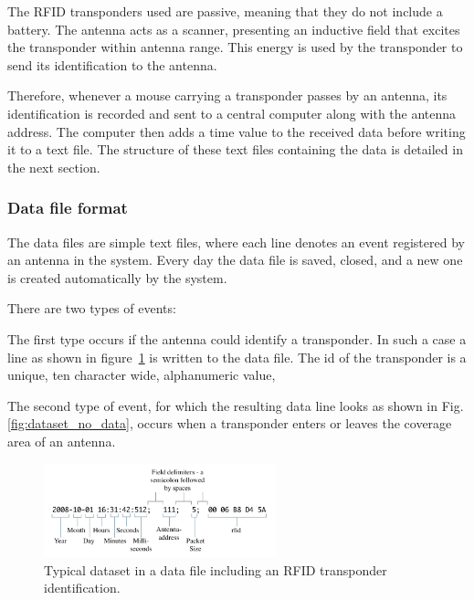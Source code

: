 The RFID transponders used are passive, meaning that they do not include a battery. The antenna acts as a scanner, presenting an inductive field that excites the transponder within antenna range. This energy is used by the transponder to send its identification to the antenna. 

Therefore, whenever a mouse carrying a transponder passes by an antenna, its identification is recorded and sent to a central computer along with the antenna address. The computer then adds a time value to the received data before writing it to a text file. The structure of these text files containing the data is detailed in the next section.

\subsubsection{Data file format}
\label{subsubsec:datafileformat}
The data files are simple text files, where each line denotes an event registered by an antenna in the system. Every day the data file is saved, closed, and a new one is created automatically by the system.

There are two types of events: %
\begin{mylist}
 \item The first type occurs if the antenna could identify a transponder. In such a case a line as shown in figure~\ref{fig:dataset} is written to the data file. The id of the transponder is a unique, ten character wide, alphanumeric value,
 \item The second type of event, for which the resulting data line looks as shown in Fig. \ref{fig:dataset_no_data}, occurs when a transponder enters or leaves the coverage area of an antenna.

\end{mylist}

\begin{figure}[!htbp]	
\centering	
\includegraphics[width=0.6\textwidth]{assets/pdf/dataset.pdf}	
\caption[Dataset including an RFID transponder identification]{Typical dataset in a data file including an RFID transponder identification.}
\label{fig:dataset}
\end{figure}

